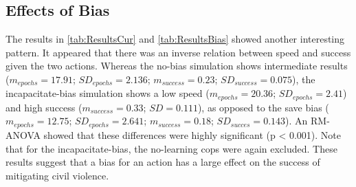 \subsection{Effects of Bias}
The results in \autoref{tab:ResultsCur} and \autoref{tab:ResultsBias} showed another interesting pattern. It appeared that there was an inverse relation between speed and success given the two actions. Whereas the no-bias simulation shows intermediate results ($m_{epochs} = 17.91$; $SD_{epochs} = 2.136$; $m_{success} = 0.23$; $SD_{success} = 0.075$), the incapacitate-bias simulation shows a low speed ($m_{epochs} = 20.36$; $SD_{epochs} = 2.41$) and high success ($m_{success} = 0.33$; $SD = 0.111$), as opposed to the save bias ($m_{epochs} = 12.75$; $SD_{epochs} = 2.641$; $m_{success} = 0.18$; $SD_{succes} = 0.143$). An RM-ANOVA showed that these differences were highly significant (p < 0.001). Note that for the incapacitate-bias, the no-learning cops were again excluded. These results suggest that a bias for an action has a large effect on the success of mitigating civil violence.

